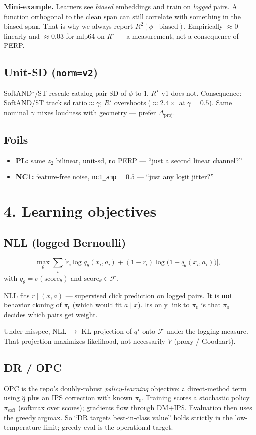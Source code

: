 \documentclass[11pt]{article}
\newcommand{\phonesection}[1]{\Needspace{8\baselineskip}\section*{#1}}
\newcommand{\phonesub}[1]{\Needspace{6\baselineskip}\subsection*{#1}}
\newcommand{\Rstar}{R^{\star}}
\newcommand{\Dproj}{\Delta_{\mathrm{proj}}}
\newcommand{\miniex}[1]{\par{\footnotesize\color{black!70}\textbf{Mini-example.} #1\par}}
\begin{document}
\miniex{Learners see \emph{biased}
embeddings and train on \emph{logged}
pairs.  A function orthogonal to the clean
span can still correlate with something in
the biased span.  That is why we always
report $R^{2}(\phi\mid\mathrm{biased})$.
Empirically $\approx 0$ linearly and
$\approx 0.03$ for mlp64 on $\Rstar$ --- a
measurement, not a consequence of PERP.}

\phonesub{Unit-SD (\texttt{norm=v2})}
SoftAND$^{\star}$/ST rescale catalog pair-SD
of $\phi$ to $1$.  $\Rstar$ v1 does not.
Consequence: SoftAND/ST track
$\mathrm{sd\_ratio}\approx\gamma$; $\Rstar$
overshoots ($\approx 2.4\times$ at
$\gamma{=}0.5$).  Same nominal $\gamma$ mixes
loudness with geometry --- prefer $\Dproj$.

\phonesub{Foils}
\begin{itemize}
  \item \textbf{PL:} same $z_{2}$ bilinear,
        unit-sd, no PERP --- ``just a second
        linear channel?''
  \item \textbf{NC1:} feature-free noise,
        \texttt{nc1\_amp}${}=0.5$ --- ``just
        any logit jitter?''
\end{itemize}

\phonesection{4. Learning objectives}

\phonesub{NLL (logged Bernoulli)}
\begin{equation*}
\max_{\theta}
\sum_{i}\Big[
  r_{i}\log q_{\theta}(x_{i},a_{i})
  +(1-r_{i})\log\big(1-q_{\theta}(x_{i},a_{i})\big)
\Big],
\end{equation*}
with $q_{\theta}=\sigma(\mathrm{score}_{\theta})$
and $\mathrm{score}_{\theta}\in\mathcal{F}$.

NLL fits $r\mid(x,a)$ --- supervised click
prediction on logged pairs.  It is
\textbf{not} behavior cloning of $\pi_{0}$
(which would fit $a\mid x$).  Its only link
to $\pi_{0}$ is that $\pi_{0}$ decides which
pairs get weight.

Under misspec, NLL $\to$ KL projection of
$q^{\star}$ onto $\mathcal{F}$ under the
logging measure.  That projection maximizes
likelihood, not necessarily $V$
(proxy / Goodhart).

\phonesub{DR / OPC}
OPC is the repo's doubly-robust
\emph{policy-learning} objective: a
direct-method term using $\hat{q}$ plus an
IPS correction with known $\pi_{0}$.
Training scores a stochastic policy
$\pi_{\mathrm{soft}}$ (softmax over scores);
gradients flow through DM$+$IPS.
Evaluation then uses the greedy argmax.
So ``DR targets best-in-class value'' holds
strictly in the low-temperature limit;
greedy eval is the operational target.
\end{document}
